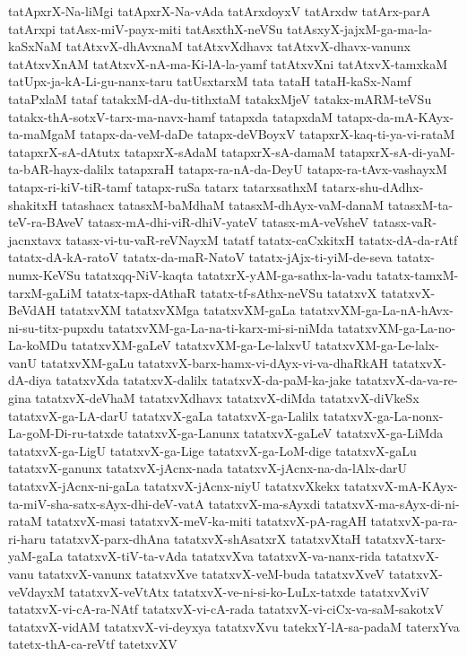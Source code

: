 {tatApxrX-Na-liMgi
tatApxrX-Na-vAda
tatArxdoyxV
tatArxdw
tatArx-parA
tatArxpi
tatAsx-miV-payx-miti
tatAsxthX-neVSu
tatAsxyX-jajxM-ga-ma-la-kaSxNaM
tatAtxvX-dhAvxnaM
tatAtxvXdhavx
tatAtxvX-dhavx-vanunx
tatAtxvXnAM
tatAtxvX-nA-ma-Ki-lA-la-yamf
tatAtxvXni
tatAtxvX-tamxkaM
tatUpx-ja-kA-Li-gu-nanx-taru
tatUsxtarxM
tata
tataH
tataH-kaSx-Namf
tataPxlaM
tataf
tatakxM-dA-du-tithxtaM
tatakxMjeV
tatakx-mARM-teVSu
tatakx-thA-sotxV-tarx-ma-navx-hamf
tatapxda
tatapxdaM
tatapx-da-mA-KAyx-ta-maMgaM
tatapx-da-veM-daDe
tatapx-deVBoyxV
tatapxrX-kaq-ti-ya-vi-rataM
tatapxrX-sA-dAtutx
tatapxrX-sAdaM
tatapxrX-sA-damaM
tatapxrX-sA-di-yaM-ta-bAR-hayx-dalilx
tatapxraH
tatapx-ra-nA-da-DeyU
tatapx-ra-tAvx-vashayxM
tatapx-ri-kiV-tiR-tamf
tatapx-ruSa
tatarx
tatarxsathxM
tatarx-shu-dAdhx-shakitxH
tatashacx
tatasxM-baMdhaM
tatasxM-dhAyx-vaM-danaM
tatasxM-ta-teV-ra-BAveV
tatasx-mA-dhi-viR-dhiV-yateV
tatasx-mA-veVsheV
tatasx-vaR-jacnxtavx
tatasx-vi-tu-vaR-reVNayxM
tatatf
tatatx-caCxkitxH
tatatx-dA-da-rAtf
tatatx-dA-kA-ratoV
tatatx-da-maR-NatoV
tatatx-jAjx-ti-yiM-de-seva
tatatx-numx-KeVSu
tatatxqq-NiV-kaqta
tatatxrX-yAM-ga-sathx-la-vadu
tatatx-tamxM-tarxM-gaLiM
tatatx-tapx-dAthaR
tatatx-tf-sAthx-neVSu
tatatxvX
tatatxvX-BeVdAH
tatatxvXM
tatatxvXMga
tatatxvXM-gaLa
tatatxvXM-ga-La-nA-hAvx-ni-su-titx-pupxdu
tatatxvXM-ga-La-na-ti-karx-mi-si-niMda
tatatxvXM-ga-La-no-La-koMDu
tatatxvXM-gaLeV
tatatxvXM-ga-Le-lalxvU
tatatxvXM-ga-Le-lalx-vanU
tatatxvXM-gaLu
tatatxvX-barx-hamx-vi-dAyx-vi-va-dhaRkAH
tatatxvX-dA-diya
tatatxvXda
tatatxvX-dalilx
tatatxvX-da-paM-ka-jake
tatatxvX-da-va-re-gina
tatatxvX-deVhaM
tatatxvXdhavx
tatatxvX-diMda
tatatxvX-diVkeSx
tatatxvX-ga-LA-darU
tatatxvX-gaLa
tatatxvX-ga-Lalilx
tatatxvX-ga-La-nonx-La-goM-Di-ru-tatxde
tatatxvX-ga-Lanunx
tatatxvX-gaLeV
tatatxvX-ga-LiMda
tatatxvX-ga-LigU
tatatxvX-ga-Lige
tatatxvX-ga-LoM-dige
tatatxvX-gaLu
tatatxvX-ganunx
tatatxvX-jAcnx-nada
tatatxvX-jAcnx-na-da-lAlx-darU
tatatxvX-jAcnx-ni-gaLa
tatatxvX-jAcnx-niyU
tatatxvXkekx
tatatxvX-mA-KAyx-ta-miV-sha-satx-sAyx-dhi-deV-vatA
tatatxvX-ma-sAyxdi
tatatxvX-ma-sAyx-di-ni-rataM
tatatxvX-masi
tatatxvX-meV-ka-miti
tatatxvX-pA-ragAH
tatatxvX-pa-ra-ri-haru
tatatxvX-parx-dhAna
tatatxvX-shAsatxrX
tatatxvXtaH
tatatxvX-tarx-yaM-gaLa
tatatxvX-tiV-ta-vAda
tatatxvXva
tatatxvX-va-nanx-rida
tatatxvX-vanu
tatatxvX-vanunx
tatatxvXve
tatatxvX-veM-buda
tatatxvXveV
tatatxvX-veVdayxM
tatatxvX-veVtAtx
tatatxvX-ve-ni-si-ko-LuLx-tatxde
tatatxvXviV
tatatxvX-vi-cA-ra-NAtf
tatatxvX-vi-cA-rada
tatatxvX-vi-ciCx-va-saM-sakotxV
tatatxvX-vidAM
tatatxvX-vi-deyxya
tatatxvXvu
tatekxY-lA-sa-padaM
taterxYva
tatetx-thA-ca-reVtf
tatetxvXV
}
